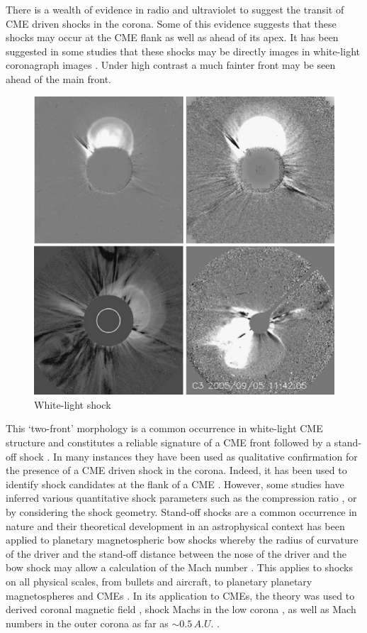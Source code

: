 There is a wealth of evidence in radio and ultraviolet to suggest the transit of CME driven shocks in the corona. Some of this evidence suggests that these shocks may occur at the CME flank as well as ahead of its apex. It has been suggested in some studies that these shocks may be directly images in white-light coronagraph images \citep{vourlidas2012, vourlidas2013}. Under high contrast a much fainter front may be seen ahead of the main front. 
\begin{figure}[!t]
\begin{center}
\includegraphics[scale=0.9, trim=0cm 0cm 0cm 0.5cm]{images/wl_shock.pdf}
\caption[White-light image of shocks]{White-light shock \citep{vourlidas2013}}
\label{fig:wl_shock}
\end{center}
\end{figure}
This \textquoteleft two-front' morphology is a common occurrence in white-light CME structure and constitutes a reliable signature of a CME front followed by a stand-off shock \citep{vourlidas2013}. In many instances they have been used as qualitative confirmation for the presence of a CME driven shock in the corona. Indeed, it has been used to identify shock candidates at the flank of a CME \citep{vourlidas2003}. However, some studies have inferred various quantitative shock parameters such as the compression ratio \citep{ontiveros2009}, or by considering the shock geometry. Stand-off shocks are a common occurrence in nature and their theoretical development in an astrophysical context has been applied to planetary magnetospheric bow shocks whereby the radius of curvature of the driver and the stand-off distance between the nose of the driver and the bow shock may allow a calculation of the Mach number \citep{spreiter1966}. This applies to shocks on all physical scales, from bullets and aircraft, to planetary planetary magnetospheres and CMEs \citep{russel2002}. In its application to CMEs, the theory was used to derived coronal magnetic field \citep{kim2012}, shock Machs in the low corona \citep{gopal2012}, as well as Mach numbers in the outer corona as far as $\sim0.5\,A.U.$ \citep{maloney2011}. 
